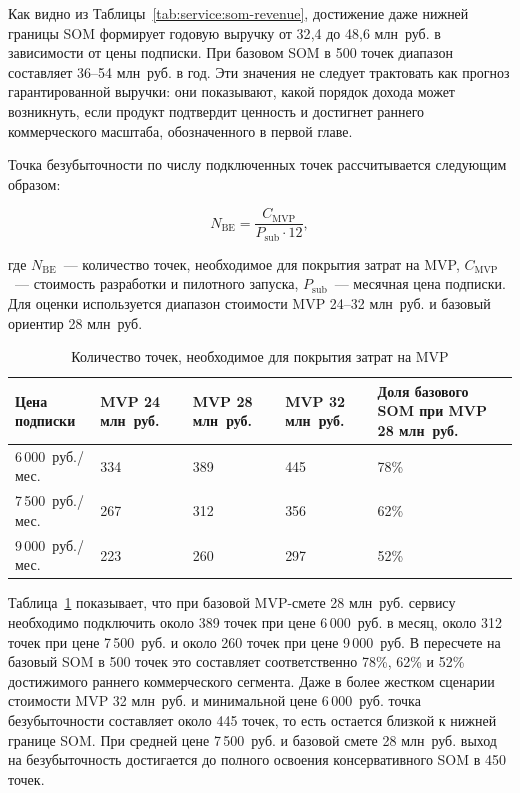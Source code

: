 Как видно из Таблицы~\ref{tab:service:som-revenue}, достижение даже нижней границы SOM формирует годовую выручку от 32{,}4 до 48{,}6 млн~руб. в зависимости от цены подписки. При базовом SOM в 500 точек диапазон составляет 36--54 млн~руб. в год. Эти значения не следует трактовать как прогноз гарантированной выручки: они показывают, какой порядок дохода может возникнуть, если продукт подтвердит ценность и достигнет раннего коммерческого масштаба, обозначенного в первой главе.

Точка безубыточности по числу подключенных точек рассчитывается следующим образом:

\begin{equation*}
    N_{\mathrm{BE}} = \frac{C_{\mathrm{MVP}}}{P_{\mathrm{sub}} \cdot 12},
\end{equation*}

где $N_{\mathrm{BE}}$~--- количество точек, необходимое для покрытия затрат на MVP, $C_{\mathrm{MVP}}$~--- стоимость разработки и пилотного запуска, $P_{\mathrm{sub}}$~--- месячная цена подписки. Для оценки используется диапазон стоимости MVP 24--32 млн~руб. и базовый ориентир 28 млн~руб.

\begin{table}[htbp]
\centering
\small
\caption{Количество точек, необходимое для покрытия затрат на MVP}
\label{tab:service:break-even}
\begin{tabularx}{\textwidth}{p{}XXXX}
\toprule
Цена подписки & MVP 24 млн~руб. & MVP 28 млн~руб. & MVP 32 млн~руб. & Доля базового SOM при MVP 28 млн~руб. \\
\midrule
6\,000~руб./мес. & 334 & 389 & 445 & 78\% \\
7\,500~руб./мес. & 267 & 312 & 356 & 62\% \\
9\,000~руб./мес. & 223 & 260 & 297 & 52\% \\
\bottomrule
\end{tabularx}
\end{table}

Таблица~\ref{tab:service:break-even} показывает, что при базовой MVP-смете 28 млн~руб. сервису необходимо подключить около 389 точек при цене 6\,000~руб. в месяц, около 312 точек при цене 7\,500~руб. и около 260 точек при цене 9\,000~руб. В пересчете на базовый SOM в 500 точек это составляет соответственно 78\%, 62\% и 52\% достижимого раннего коммерческого сегмента. Даже в более жестком сценарии стоимости MVP 32 млн~руб. и минимальной цене 6\,000~руб. точка безубыточности составляет около 445 точек, то есть остается близкой к нижней границе SOM. При средней цене 7\,500~руб. и базовой смете 28 млн~руб. выход на безубыточность достигается до полного освоения консервативного SOM в 450 точек.

